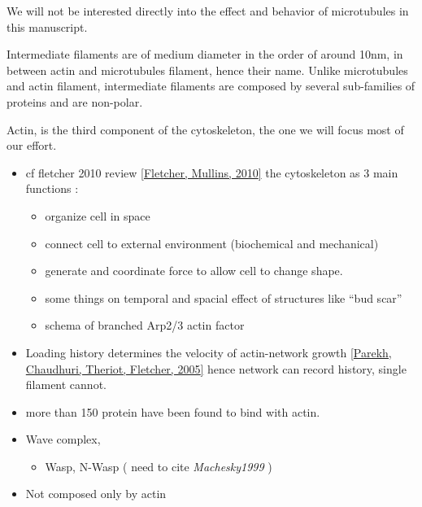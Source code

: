 \documentclass[A4paperpaper,11pt,english]{sphinxmanual}
\begin{document}
We will not be interested directly into the effect and behavior of microtubules in this manuscript.

Intermediate filaments are of medium diameter in the order of around 10nm, in
between actin and microtubules filament, hence their name.  Unlike microtubules
and actin filament, intermediate filaments are composed by several sub-families
of proteins and are non-polar.

Actin, is the third component of the cytoskeleton, the one we will focus most of our effort.
\begin{itemize}
\item {} 
cf fletcher 2010 review {\hyperref[bibitem:fletcher2010]{{[}Fletcher, Mullins,  2010{]}}} the cytoskeleton as 3 main functions :
\begin{itemize}
\item {} 
organize cell in space

\item {} 
connect cell to external environment (biochemical and mechanical)

\item {} 
generate and coordinate force to allow cell to change shape.

\item {} 
some things on temporal and spacial effect of structures like ``bud scar''

\item {} 
schema of branched Arp2/3 actin factor

\end{itemize}

\item {} 
Loading history determines the velocity of actin-network growth
{\hyperref[bibitem:parekh2005]{{[}Parekh, Chaudhuri, Theriot, Fletcher,  2005{]}}} hence network can record history, single filament
cannot.

\item {} 
more than 150 protein have been found to bind with actin.

\item {} 
Wave complex,
\begin{itemize}
\item {} 
Wasp, N-Wasp ( need to cite \emph{Machesky1999} )

\end{itemize}

\item {} 
Not composed only by actin

\end{itemize}
\end{document}
